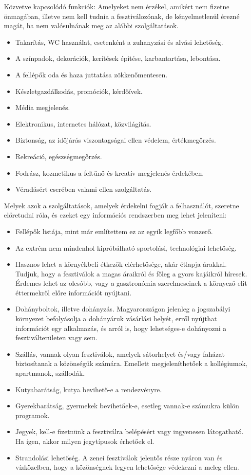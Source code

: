 \documentclass[11pt]{article}
\begin{document}
Közvetve kapcsolódó funkciók: Amelyeket nem érzékel, amikért nem fizetne önmagában, illetve nem kell tudnia a fesztiválozónak, de kényelmetlenül érezné magát, ha nem valósulnának meg az alábbi szolgáltatások.
\begin{itemize}
\item Takarítás, WC használat, esetenként a zuhanyzási és alvási lehetőség.
\item A színpadok, dekorációk, kerítések építése, karbantartása, lebontása.
\item A fellépők oda és haza juttatása zökkenőmentesen.
\item Készletgazdálkodás, promóciók, kérdőívek.
\item Média megjelenés.
\item Elektronikus, internetes hálózat, közvilágítás.
\item Biztonság, az időjárás viszontagságai ellen védelem, értékmegőrzés.
\item Rekreáció, egészségmegőrzés.
\item Fodrász, kozmetikus a feltűnő és kreatív megjelenés érdekében.
\item Véradásért cserében valami ellen szolgáltatás.
\end{itemize}

Melyek azok a szolgáltatások, amelyek érdekelni fogják a felhasználót, szeretne előretudni róla, és ezeket egy információs rendszerben meg lehet jeleníteni: \begin{itemize}
\item Fellépők listája, mint már említettem ez az egyik legfőbb vonzerő.
\item Az extrém nem mindenhol kipróbálható sportolási, technológiai lehetőség.
\item Hasznos lehet a környékbeli étkezők elérhetősége, akár étlapja árakkal. Tudjuk, hogy a fesztiválok a magas áraikról és főleg a gyors kajáikról híresek. Érdemes lehet az olcsóbb, vagy a gasztronómia szerelmeseinek a környező elit éttermekről előre információt nyújtani.
\item Dohányboltok, illetve dohányzás. Magyarországon jelenleg a jogszabályi környezet befolyásolja a dohányáruk vásárlási helyét, erről nyújthat információt egy alkalmazás, és arról is, hogy lehetséges-e dohányozni a fesztiválterületen vagy sem.
\item Szállás, vannak olyan fesztiválok, amelyek sátorhelyet és/vagy faházat biztosítanak a közönségük számára. Emellett megjeleníthetőek a kollégiumok, apartmanok, szállodák.
\item Kutyabarátság, kutya bevihető-e a rendezvényre.
\item Gyerekbarátság, gyermekek bevihetőek-e, esetleg vannak-e számukra külön programok.
\item Jegyek, kell-e fizetnünk a fesztiválra belépésért vagy ingyenesen látogatható. Ha igen, akkor milyen jegytípusok érhetőek el.
\item Strandolási lehetőség. A zenei fesztiválok jelentős része nyáron van és vízközelben, hogy a közönségnek legyen lehetősége védekezni a meleg ellen.
\end{itemize}
\end{document}
